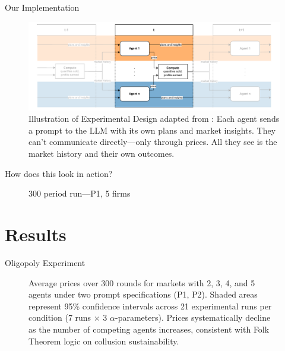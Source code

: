 \documentclass[10pt, aspectratio=169]{beamer}
\begin{document}
\begin{frame}[fragile]{Our Implementation}\label{experiment}
    \begin{figure}[htpb!]
      \centering
      \includegraphics[width=1\linewidth]{latex/imgs/illustration_diagram_experiment.pdf}
        \caption{Illustration of Experimental Design adapted from \textcite[p. 9]{fish_algorithmic_2025}: Each agent sends a prompt to the LLM with its own plans and market insights. They can't communicate directly—only through prices. All they see is the market history and their own outcomes.}
        \label{fig:experimental_design}
    \end{figure}
    \hfill\hyperlink{app:prompts}{}
\end{frame}


\begin{frame}{How does this look in action?}
    \begin{figure}
        \centering
        \caption{300 period run---P1, 5 firms}
        \label{fig:run}
    \end{figure}
\end{frame}


\section{Results}

\begin{frame}{Oligopoly Experiment}
    \begin{figure}[htpb!]
        \centering
        
        \caption{Average prices over 300 rounds for markets with 2, 3, 4, and 5 agents under two prompt specifications (P1, P2). Shaded areas represent 95\% confidence intervals across 21 experimental runs per condition (7 runs × 3 $\alpha$-parameters). Prices systematically decline as the number of competing agents increases, consistent with Folk Theorem logic on collusion sustainability.}
        \label{fig:ts_prices_comb}
    \end{figure}
\end{frame}
\end{document}
